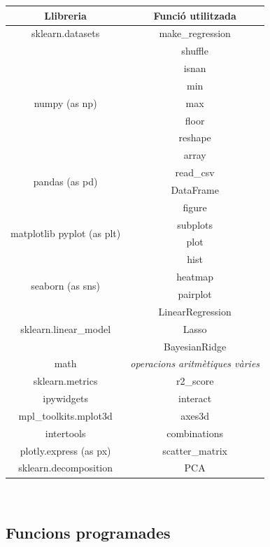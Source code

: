 \documentclass[a4paper, 11pt]{article}
\begin{document}
\begin{table}[h]
    \centering
    \begin{tabular}{c|c}
        \textbf{Llibreria} & \textbf{Funció utilitzada} \\\hline\hline
        sklearn.datasets & make\_regression \\ \hline
        \multirow{7}{*}{numpy (as np)} & shuffle \\
        & isnan\\ 
        & min\\ 
        & max\\
        & floor\\
        & reshape\\
        & array\\ \hline
         \multirow{2}{*}{pandas (as pd)} & read\_csv \\ 
        & DataFrame \\ \hline
        \multirow{4}{*}{matplotlib pyplot (as plt)} & figure\\
        & subplots \\ 
        & plot \\ 
        & hist \\ \hline
        \multirow{2}{*}{seaborn (as sns)} & heatmap \\ 
         & pairplot \\ \hline
        \multirow{3}{*}{sklearn.linear\_model} & LinearRegression \\
         & Lasso\\ 
         & BayesianRidge\\ \hline
        math & \textit{operacions aritmètiques vàries}\\ \hline
        sklearn.metrics & r2\_score \\ \hline
        ipywidgets & interact \\ \hline
        mpl\_toolkits.mplot3d & axes3d \\ \hline
        intertools & combinations \\ \hline
        plotly.express (as px) & scatter\_matrix\\ \hline
        sklearn.decomposition & PCA\\
        
    \end{tabular}
    \label{tab:my_label}
\end{table}\\

\newpage
\subsection{Funcions programades}
\end{document}
